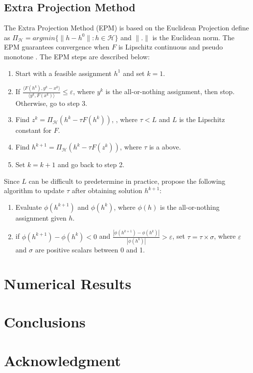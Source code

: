 \documentclass[conference]{IEEEtran}
\renewcommand{\:}{\mathrel{\coloneqq}}
\renewcommand{\=}{\ensuremath{\eqqcolon}}
\renewcommand{\epsilon}{\varepsilon}
\newcommand{\0}{\ensuremath{\boldsymbol{0}}}
\begin{document}
\subsection{Extra Projection Method}
The Extra Projection Method (EPM) is based on the Euclidean Projection define as $\Pi_\mathcal{H} = argmin\{\lVert h-h^0\rVert:h \in\mathcal{H} \}$ and $\lVert.\rVert$ is the Euclidean norm. The EPM guarantees convergence when $F$ is Lipschitz continuous and pseudo monotone \cite{nie2010solving}. The EPM steps are described below:
\begin{enumerate}
\item Start with a feasible assignment $h^1$ and set $k=1$.
\item If ${\frac {\langle F(h^k),y^k-x^k \rangle} {\langle y^k, F(x^k)\rangle}} \leq \epsilon$, where $y^k$ is the all-or-nothing assignment, then stop. Otherwise, go to step 3.
\item Find $z^k = \Pi_\mathcal{H}(h^k - \tau F(h^k))$, , where $\tau < L$ and $L$ is the Lipschitz constant for $F$.
\item Find $h^{k+1} = \Pi_\mathcal{H}(h^k - \tau F(z^k))$, where $\tau$ is a above.
\item Set $k = k+1$ and go back to step 2.
\end{enumerate}

Since $L$ can be difficult to predetermine in practice, \cite{nie2010solving} propose the following algorithm to update $\tau$ after obtaining solution $h^{k+1}$:
\begin{enumerate}
    \item Evaluate $\phi(h^{k+1})$ and $\phi(h^k)$, where $\phi(h)$ is the all-or-nothing assignment given $h$.
    \item if $\phi(h^{k+1})-\phi(h^k) < 0$ and $\frac{|\phi(h^{k+1})-\phi(h^k)|}{|\phi(h^k)|}> \epsilon$, set $\tau = \tau \times \sigma$, where $\epsilon$ and $\sigma$ are positive scalars between 0 and 1.
\end{enumerate}

\section{Numerical Results}

\section{Conclusions}\label{sec:concl}

\section*{Acknowledgment}




\end{document}

